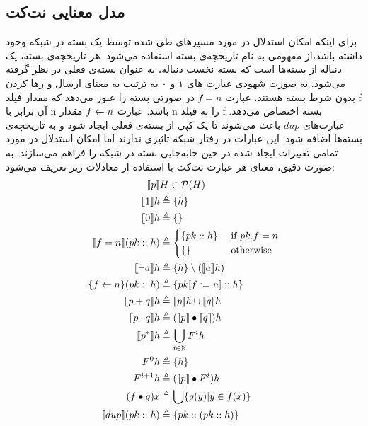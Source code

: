 \subsection{مدل معنایی نت‌کت}
برای اینکه امکان استدلال در مورد مسیر‌های طی شده توسط یک بسته‌ در شبکه وجود داشته باشد،از مفهومی به نام تاریخچه‌ی بسته
استفاده می‌شود.
هر تاریخچه‌ی بسته‌، یک دنباله از بسته‌ها است که بسته نخست دنباله، به عنوان بسته‌ی فعلی در نظر گرفته می‌شود.
به صورت شهودی
عبارت های ۱ و ۰ به ترتیب به معنای ارسال
و رها کردن
بدون شرط بسته هستند.
عبارت
$f=n$
در صورتی بسته را عبور می‌دهد که مقدار فیلد
f
آن برابر با
n
باشد.
عبارت
$f \leftarrow n$
مقدار n
را به فیلد f
بسته اختصاص
می‌دهد.
عبارت‌های
$dup$
باعث می‌شوند تا یک کپی از بسته‌ی فعلی ایجاد شود و به تاریخچه‌ی بسته‌ها اضافه شود.
این عبارات در رفتار شبکه تاثیری ندارند اما امکان استدلال در مورد تمامی تغییرات ایجاد شده در حین جا‌به‌جایی بسته در شبکه را فراهم می‌سازند.
به صورت دقیق، معنای هر عبارت
نت‌کت با استفاده از معادلات زیر تعریف می‌شود:
\begin{align}
    \llbracket p \rrbracket             & H \in \mathcal{P}({H}) \label{eq:netkat:sem}                  \\
    \llbracket 1 \rrbracket h           & \triangleq \{h\}     \label{eq:netkat:identity}                     \\
    \llbracket 0 \rrbracket h           & \triangleq \{\}          \label{eq:netkat:drop}                     \\
    \llbracket f=n \rrbracket(pk::h)    & \triangleq \begin{cases}
                                   \{pk::h\} & \text{ if } pk.f = n \\
                                   \{\}      & \text{ otherwise }
                               \end{cases}    \label{eq:netkat:filter}                  \\
    \llbracket \neg a \rrbracket h       & \triangleq \{h\} \setminus (\llbracket a \rrbracket h) \label{eq:netkat:nfilter}     \\
    \{f \leftarrow n\} (pk::h) & \triangleq \{pk[f:=n]::h\}     \label{eq:netkat:assign}             \\
    \llbracket p+q \rrbracket h          & \triangleq \llbracket p \rrbracket h \cup \llbracket q \rrbracket h   \label{eq:netkat:sum}           \\
    \llbracket p\cdot q \rrbracket h    & \triangleq (\llbracket p \rrbracket \bullet \llbracket q \rrbracket) h    \label{eq:netkat:dot}     \\
    \llbracket p^* \rrbracket h          & \triangleq \bigcup_{i \in \mathbb{N}}F^i h \label{eq:netkat:kleene} \\
    F^0 h               & \triangleq \{h\}                                                    \\
    F^{i+1} h           & \triangleq (\llbracket p \rrbracket \bullet F^i) h                                  \\
    (f \bullet g) x     & \triangleq \bigcup\{g(y)|y \in f(x)\}                               \\
    \llbracket dup \rrbracket (pk::h)   & \triangleq \{pk::(pk::h)\} \label{eq:netkat:dup}
\end{align}
